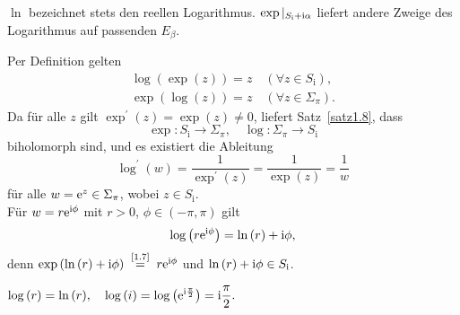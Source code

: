 \documentclass[a4paper,twoside,DIV15,BCOR12mm]{scrbook}
\begin{document}
\begin{bem*}
  $\ln$ bezeichnet stets den reellen Logarithmus. $\exp|_{S_\text{i}+\mathrm{i}\alpha}$ liefert andere Zweige des Logarithmus auf
  passenden $E_\beta$.
\end{bem*}

\noindent Per Definition gelten
\begin{gather*}
  \log{(\exp{(z)})} = z \quad (\forall z \in S_\text{i}),\\
  \exp{(\log{(z)})} = z \quad (\forall z \in \Sigma_\pi).
\end{gather*}
Da für alle $z$ gilt $\exp^\prime{(z)} = \exp{(z)} \neq 0$, liefert Satz~\ref{satz1.8}, dass
\[\exp\colon S_\text{i} \to \Sigma_\pi, \quad \log\colon \Sigma_\pi \to S_\text{i}\]
biholomorph sind, und es existiert die Ableitung
\[\log^\prime{(w)} = \frac{1}{\exp^\prime{(z)}} = \frac{1}{\exp{(z)}} = \frac1w\]
für alle $w=\mathrm{e}^z \in \Sigma_\pi$, wobei $z\in S_\text{i}$.\\
Für $w=r\mathrm{e}^{\mathrm{i}\phi}$ mit $r>0$, $\phi\in(-\pi,\pi)$ gilt
\begin{equation} \label{1.9}
\log{\left(r\mathrm{e}^{\mathrm{i}\phi}\right)} = \ln{(r)} + \mathrm{i}\phi,
\end{equation}
denn $\exp{(\ln{(r)} + \i\phi)} \nach{=}{\eqref{1.7}} r\e^{\i\phi}$ und $\ln{(r)}+\mathrm{i}\phi \in S_\text{i}$.

\begin{bsp*}
  $\displaystyle \log{(r)} = \ln{(r)}, \quad \log{(i)} = \log{\left(\mathrm{e}^{\mathrm{i}\frac\pi2}\right)} = \mathrm{i}\frac\pi2.$
\end{bsp*}
\end{document}
